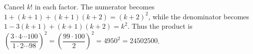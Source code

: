 Cancel $k!$ in each factor. The numerator becomes $1+(k+1)+(k+1)(k+2)=(k+2)^2$, while the denominator becomes $1-3(k+1)+(k+1)(k+2)=k^2$. Thus the product is $\left(\dfrac{3\cdot4\cdots100}{1\cdot2\cdots98}\right)^2=\left(\dfrac{99\cdot100}{2}\right)^2=4950^2=\boxed{24502500}$.
